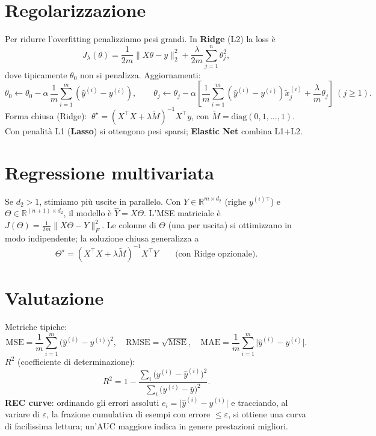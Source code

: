 \section{Regolarizzazione}
Per ridurre l’overfitting penalizziamo pesi grandi. In \textbf{Ridge} (L2) la loss è
\[
J_\lambda(\theta)=\frac{1}{2m}\|X\theta-y\|_2^2+\frac{\lambda}{2m}\sum_{j=1}^{n}\theta_j^2,
\]
dove tipicamente \(\theta_0\) non si penalizza. Aggiornamenti:
\[
\theta_0\leftarrow \theta_0-\alpha\,\frac{1}{m}\sum_{i=1}^m(\hat y^{(i)}-y^{(i)}),\qquad
\theta_j\leftarrow \theta_j-\alpha\left[\frac{1}{m}\sum_{i=1}^m(\hat y^{(i)}-y^{(i)})\tilde x^{(i)}_j+\frac{\lambda}{m}\theta_j\right]\ (j\ge 1).
\]
Forma chiusa (Ridge): \(\ \theta^\star=(X^\top X+\lambda \tilde M)^{-1}X^\top y\), con
\(\tilde M=\mathrm{diag}(0,1,\dots,1)\).
Con penalità L1 (\textbf{Lasso}) si ottengono pesi sparsi; \textbf{Elastic Net} combina L1+L2.

\section{Regressione multivariata}
Se \(d_2>1\), stimiamo più uscite in parallelo. Con \(Y\in\mathbb{R}^{m\times d_2}\) (righe \(y^{(i)\top}\))
e \(\Theta\in\mathbb{R}^{(n+1)\times d_2}\), il modello è \(\hat{Y}=X\Theta\). L’MSE matriciale è
\(J(\Theta)=\tfrac{1}{2m}\|X\Theta-Y\|_F^2\). Le colonne di \(\Theta\) (una per uscita) si
ottimizzano in modo indipendente; la soluzione chiusa generalizza a
\[
\Theta^\star=(X^\top X+\lambda \tilde M)^{-1}X^\top Y\qquad\text{(con Ridge opzionale)}.
\]

\section{Valutazione}
Metriche tipiche:
\[
\text{MSE}=\frac{1}{m}\sum_{i=1}^m\!\big(\hat y^{(i)}-y^{(i)}\big)^2,\quad
\text{RMSE}=\sqrt{\text{MSE}},\quad
\text{MAE}=\frac{1}{m}\sum_{i=1}^m\!\lvert \hat y^{(i)}-y^{(i)}\rvert.
\]
\noindent
\textbf{\(R^2\)} (coefficiente di determinazione):
\[
R^2=1-\frac{\sum_i\big(y^{(i)}-\hat{y}^{(i)}\big)^2}{\sum_i\big(y^{(i)}-\bar{y}\big)^2}.
\]
\textbf{REC curve}: ordinando gli errori assoluti \(e_i=\lvert \hat y^{(i)}-y^{(i)}\rvert\) e
tracciando, al variare di \(\varepsilon\), la frazione cumulativa di esempi con errore
\(\le\varepsilon\), si ottiene una curva di facilissima lettura; un’AUC maggiore indica in
genere prestazioni migliori.
